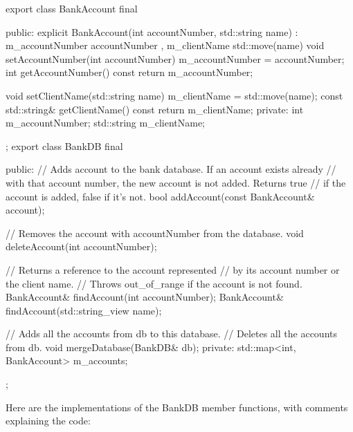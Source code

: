\begin{cpp}
export class BankAccount final
{
    public:
        explicit BankAccount(int accountNumber, std::string name)
            : m_accountNumber { accountNumber }, m_clientName { std::move(name) }{}
        void setAccountNumber(int accountNumber) {
            m_accountNumber = accountNumber; }
        int getAccountNumber() const { return m_accountNumber; }

        void setClientName(std::string name) { m_clientName = std::move(name); }
        const std::string& getClientName() const { return m_clientName; }
    private:
        int m_accountNumber;
        std::string m_clientName;
};
export class BankDB final
{
    public:
        // Adds account to the bank database. If an account exists already
        // with that account number, the new account is not added. Returns true
        // if the account is added, false if it's not.
        bool addAccount(const BankAccount& account);

        // Removes the account with accountNumber from the database.
        void deleteAccount(int accountNumber);

        // Returns a reference to the account represented
        // by its account number or the client name.
        // Throws out_of_range if the account is not found.
        BankAccount& findAccount(int accountNumber);
        BankAccount& findAccount(std::string_view name);

        // Adds all the accounts from db to this database.
        // Deletes all the accounts from db.
        void mergeDatabase(BankDB& db);
    private:
        std::map<int, BankAccount> m_accounts;
};
\end{cpp}

Here are the implementations of the BankDB member functions, with comments explaining the code:


